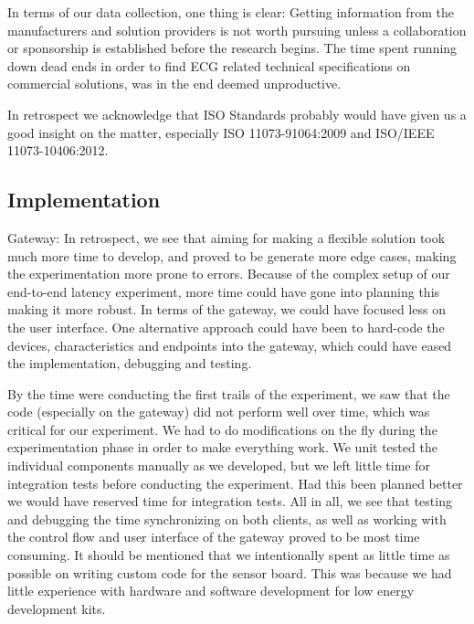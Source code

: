 In terms of our data collection, one thing is clear: Getting information from the manufacturers and solution providers is not worth pursuing unless a collaboration or sponsorship is established before the research begins. The time spent running down dead ends in order to find ECG related technical specifications on commercial solutions, was in the end deemed unproductive.

In retrospect we acknowledge that ISO Standards probably would have given us a good insight on the matter, especially ISO 11073-91064:2009 and ISO/IEEE 11073-10406:2012.



\subsection{Implementation} %
\label{sub:implementation}


Gateway: In retrospect, we see that aiming for making a flexible solution took much more time to develop, and proved to be generate more edge cases, making the experimentation more prone to errors. Because of the complex setup of our end-to-end latency experiment, more time could have gone into planning this making it more robust. In terms of the gateway, we could have focused less on the user interface. One alternative approach could have been to hard-code the devices, characteristics and endpoints into the gateway, which could have eased the implementation, debugging and testing. 

By the time were conducting the first trails of the experiment, we saw that the code (especially on the gateway) did not perform well over time, which was critical for our experiment. We had to do modifications on the fly during the experimentation phase in order to make everything work. We unit tested the individual components manually as we developed, but we left little time for integration tests before conducting the experiment. Had this been planned better we would have reserved time for integration tests. All in all, we see that testing and debugging the time synchronizing on both clients, as well as working with the control flow and user interface of the gateway proved to be most time consuming. It should be mentioned that we intentionally spent as little time as possible on writing custom code for the sensor board. This was because we had little experience with hardware and software development for low energy development kits. 

